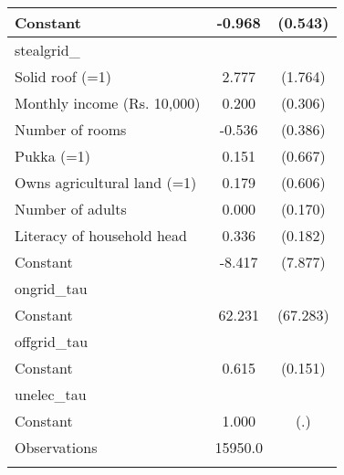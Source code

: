\begin{table}[htbp]
{\begin{tabular}{l*{1}{cc}}
Constant            &      -0.968\sym{*}  &     (0.543)\\
\midrule
stealgrid\_          &                     &            \\
Solid roof (=1)     &       2.777         &     (1.764)\\
Monthly income (Rs. 10,000)&       0.200         &     (0.306)\\
Number of rooms     &      -0.536         &     (0.386)\\
Pukka (=1)          &       0.151         &     (0.667)\\
Owns agricultural land (=1)&       0.179         &     (0.606)\\
Number of adults    &       0.000         &     (0.170)\\
Literacy of household head&       0.336\sym{*}  &     (0.182)\\
Constant            &      -8.417         &     (7.877)\\
\midrule
ongrid\_tau          &                     &            \\
Constant            &      62.231         &    (67.283)\\
\midrule
offgrid\_tau         &                     &            \\
Constant            &       0.615\sym{***}&     (0.151)\\
\midrule
unelec\_tau          &                     &            \\
Constant            &       1.000         &         (.)\\
\midrule
Observations        &     15950.0         &            \\
\bottomrule
\multicolumn{3}{l}{\footnotesize }\\
\end{tabular}}
\end{table}

